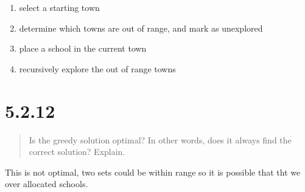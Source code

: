 \documentclass[12pt, letterpaper, twoside]{article}
\begin{document}
\begin{enumerate}
    \item select a starting town
    \item determine which towns are out of range, and mark as unexplored
    \item place a school in the current town
    \item recursively explore the out of range towns
\end{enumerate}

\section*{5.2.12}

\begin{quote}
    Is the greedy solution optimal? In other words, does it always find the correct solution? Explain.
\end{quote}

This is not optimal, two sets could be within range so it is possible that tht we over allocated schools.
\end{document}
